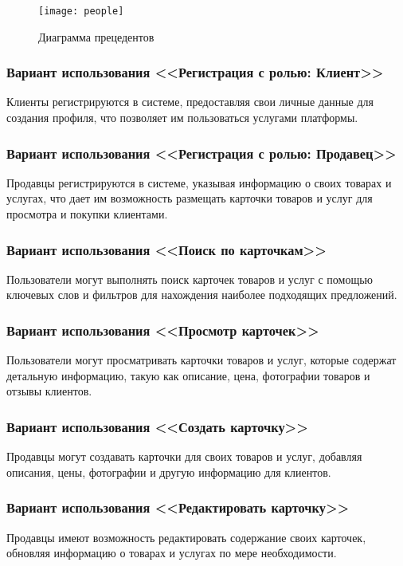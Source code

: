 \begin{figure}[ht]
\centering
\texttt{[image: people]}
\caption{Диаграмма прецедентов}
\label{people:image}
\end{figure}

\subsubsection{Вариант использования <<Регистрация с ролью: Клиент>>}
Клиенты регистрируются в системе, предоставляя свои личные данные для создания профиля, что позволяет им пользоваться услугами платформы.

\subsubsection{Вариант использования <<Регистрация с ролью: Продавец>>}
Продавцы регистрируются в системе, указывая информацию о своих товарах и услугах, что дает им возможность размещать карточки товаров и услуг для просмотра и покупки клиентами.

\subsubsection{Вариант использования <<Поиск по карточкам>>}
Пользователи могут выполнять поиск карточек товаров и услуг с помощью ключевых слов и фильтров для нахождения наиболее подходящих предложений.

\subsubsection{Вариант использования <<Просмотр карточек>>}
Пользователи могут просматривать карточки товаров и услуг, которые содержат детальную информацию, такую как описание, цена, фотографии товаров и отзывы клиентов.

\subsubsection{Вариант использования <<Создать карточку>>}
Продавцы могут создавать карточки для своих товаров и услуг, добавляя описания, цены, фотографии и другую информацию для клиентов.

\subsubsection{Вариант использования <<Редактировать карточку>>}
Продавцы имеют возможность редактировать содержание своих карточек, обновляя информацию о товарах и услугах по мере необходимости.

